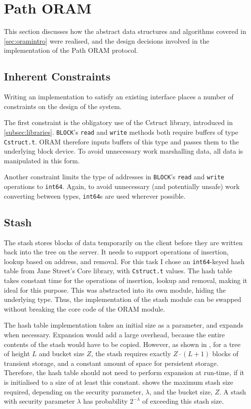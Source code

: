 \documentclass[12pt,a4paper,twoside,openright]{report}
\begin{document}
\section{Path ORAM}
\label{sec:pathORAM}

This section discusses how the abstract data structures and algorithms covered in \cref{sec:oramintro} were realised, and the design decisions involved in the implementation of the Path ORAM protocol.

\subsection{Inherent Constraints}
\label{subsec:constraints}

Writing an implementation to satisfy an existing interface places a number of constraints on the design of the system.

The first constraint is the obligatory use of the Cstruct library, introduced in \cref{subsec:libraries}. \texttt{BLOCK}'s \texttt{read} and \texttt{write} methods both require buffers of type \texttt{Cstruct.t}. ORAM therefore inputs buffers of this type and passes them to the underlying block device. To avoid unnecessary work marshalling data, all data is manipulated in this form.

Another constraint limits the type of addresses in \texttt{BLOCK}'s \texttt{read} and \texttt{write} operations to \texttt{int64}. Again, to avoid unnecessary (and potentially unsafe) work converting between types, \texttt{int64}s are used wherever possible.

\subsection{Stash}
\label{subsec:stashImpl}

The stash stores blocks of data temporarily on the client before they are written back into the tree on the server. It needs to support operations of insertion, lookup based on address, and removal. For this task I chose an \texttt{int64}-keyed hash table from Jane Street's Core library, with \texttt{Cstruct.t} values. The hash table takes constant time for the operations of insertion, lookup and removal, making it ideal for this purpose. This was abstracted into its own module, hiding the underlying type. Thus, the implementation of the stash module can be swapped without breaking the core code of the ORAM module.

The hash table implementation takes an initial size as a parameter, and expands when necessary. Expansion would add a large overhead, because the entire contents of the stash would have to be copied. However, as shown in \citet{stefanov2013path}, for a tree of height $L$ and bucket size $Z$, the stash requires exactly $Z \cdot (L +1)$ blocks of transient storage, and a constant amount of space for persistent storage. Therefore, the hash table should not need to perform expansion at run-time, if it is initialised to a size of at least this constant.  shows the maximum stash size required, depending on the security parameter, $\lambda$, and the bucket size, $Z$. A stash with security parameter $\lambda$ has probability $2^{-\lambda}$ of exceeding this stash size.
\end{document}
